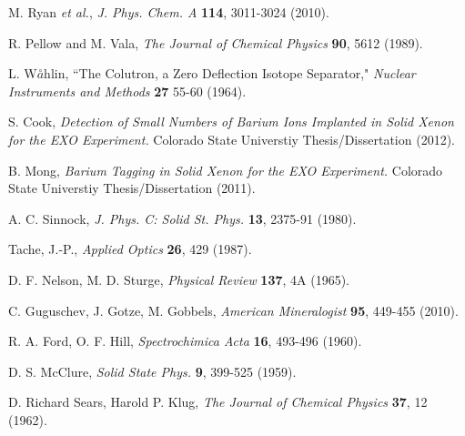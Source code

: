 \documentclass[PhD, copyrightpage]{csuthesis} %
\begin{document}
\begin{thebibliography}{00}
 
  M. Ryan \emph{et al.}, \emph{J. Phys. Chem. A} \textbf{114}, 3011-3024 (2010).
 
  R. Pellow and M. Vala, \emph{The Journal of Chemical Physics} \textbf{90}, 5612 (1989).
 
  L. W$\overset{\circ}{a}$hlin, ``The Colutron, a Zero Deflection Isotope Separator," \emph{Nuclear Instruments and Methods} \textbf{27} 55-60 (1964).
 
 
  S. Cook, \emph{Detection of Small Numbers of Barium Ions Implanted in Solid Xenon for the EXO Experiment.}  Colorado State Universtiy Thesis/Dissertation (2012).
 
  B. Mong, \emph{Barium Tagging in Solid Xenon for the EXO Experiment.}  Colorado State Universtiy Thesis/Dissertation (2011).
 
  A. C. Sinnock, \emph{J. Phys. C: Solid St. Phys.} \textbf{13}, 2375-91 (1980).
 
   Tache, J.-P., \emph{Applied Optics} \textbf{26}, 429 (1987).

  D. F. Nelson, M. D. Sturge, \emph{Physical Review} \textbf{137}, 4A (1965).
 
  C. Guguschev, J. Gotze, M. Gobbels, \emph{American Mineralogist} \textbf{95}, 449-455 (2010).
 
  R. A. Ford, O. F. Hill, \emph{Spectrochimica Acta} \textbf{16}, 493-496 (1960).
 
  D. S. McClure, \emph{Solid State Phys.} \textbf{9}, 399-525 (1959).
 
  D. Richard Sears, Harold P. Klug, \emph{The Journal of Chemical Physics} \textbf{37}, 12 (1962).
 
 \end{thebibliography}
% 
\end{document}
